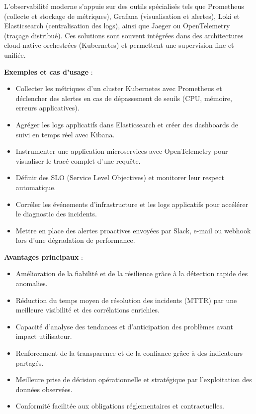 L’observabilité moderne s’appuie sur des outils spécialisés tels que Prometheus (collecte et stockage de métriques), Grafana (visualisation et alertes), Loki et Elasticsearch (centralisation des logs), ainsi que Jaeger ou OpenTelemetry (traçage distribué). Ces solutions sont souvent intégrées dans des architectures cloud-native orchestrées (Kubernetes) et permettent une supervision fine et unifiée.

\textbf{Exemples et cas d’usage} :
\begin{itemize}
	\item Collecter les métriques d’un cluster Kubernetes avec Prometheus et déclencher des alertes en cas de dépassement de seuils (CPU, mémoire, erreurs applicatives).
	\item Agréger les logs applicatifs dans Elasticsearch et créer des dashboards de suivi en temps réel avec Kibana.
	\item Instrumenter une application microservices avec OpenTelemetry pour visualiser le tracé complet d’une requête.
	\item Définir des SLO (Service Level Objectives) et monitorer leur respect automatique.
	\item Corréler les événements d’infrastructure et les logs applicatifs pour accélérer le diagnostic des incidents.
	\item Mettre en place des alertes proactives envoyées par Slack, e-mail ou webhook lors d’une dégradation de performance.
\end{itemize}

\textbf{Avantages principaux} :
\begin{itemize}
	\item Amélioration de la fiabilité et de la résilience grâce à la détection rapide des anomalies.
	\item Réduction du temps moyen de résolution des incidents (MTTR) par une meilleure visibilité et des corrélations enrichies.
	\item Capacité d’analyse des tendances et d’anticipation des problèmes avant impact utilisateur.
	\item Renforcement de la transparence et de la confiance grâce à des indicateurs partagés.
	\item Meilleure prise de décision opérationnelle et stratégique par l’exploitation des données observées.
	\item Conformité facilitée aux obligations réglementaires et contractuelles.
\end{itemize}

